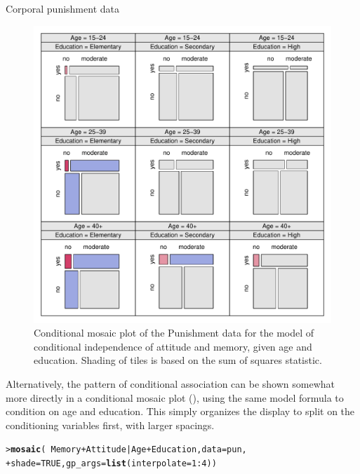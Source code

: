 \documentclass[10pt,krantz2]{krantz}\usepackage[]{graphicx}\usepackage[]{color}
\makeatletter
\newcommand{\hlnum}[1]{\textcolor[rgb]{0.686,0.059,0.569}{#1}}%
\newcommand{\hlopt}[1]{\textcolor[rgb]{0,0,0}{#1}}%
\newcommand{\hlstd}[1]{\textcolor[rgb]{0.345,0.345,0.345}{#1}}%
\newcommand{\hlkwc}[1]{\textcolor[rgb]{0.333,0.667,0.333}{#1}}%
\newcommand{\hlkwd}[1]{\textcolor[rgb]{0.737,0.353,0.396}{\textbf{#1}}}%
\newenvironment{kframe}{%
 \def\at@end@of@kframe{}%
 \ifinner\ifhmode%
  \def\at@end@of@kframe{\end{minipage}}%
  \begin{minipage}{\columnwidth}%
 \fi\fi%
 \def\FrameCommand##1{\hskip\@totalleftmargin \hskip-\fboxsep
 \colorbox{shadecolor}{##1}\hskip-\fboxsep
     \hskip-\linewidth \hskip-\@totalleftmargin \hskip\columnwidth}%
 \MakeFramed {\advance\hsize-\width
   \@totalleftmargin\z@ \linewidth\hsize
   \@setminipage}}%
 {\par\unskip\endMakeFramed%
 \at@end@of@kframe}
\newenvironment{knitrout}{}{} %
\renewenvironment{knitrout}{\small\renewcommand{\baselinestretch}{.85}}{} %
\makeatother
\begin{document}
\begin{Example}[punish]{Corporal punishment data}
\begin{knitrout}
\begin{figure}[!htb]
\centerline{\includegraphics[width=.95\textwidth]{ch05/fig/punish-cond1-1} }

\caption[Conditional mosaic plot of the Punishment data for the model of conditional independence of attitude and memory, given age and education]{Conditional mosaic plot of the Punishment data for the model of conditional independence of attitude and memory, given age and education. Shading of tiles is based on the sum of squares statistic.\label{fig:punish-cond1}}
\end{figure}


\end{knitrout}

Alternatively, the pattern of conditional association can be shown somewhat more directly
in a conditional mosaic plot (), using the same model formula to condition on
age and education. This simply organizes the display to split on the conditioning
variables first, with larger spacings.
\begin{knitrout}
\color{fgcolor}\begin{kframe}
\begin{alltt}
\hlstd{> }\hlkwd{mosaic}\hlstd{(}\hlopt{~} \hlstd{Memory} \hlopt{+} \hlstd{Attitude} \hlopt{|} \hlstd{Age} \hlopt{+} \hlstd{Education,} \hlkwc{data} \hlstd{= pun,}
\hlstd{+ }       \hlkwc{shade} \hlstd{=} \hlnum{TRUE}\hlstd{,} \hlkwc{gp_args} \hlstd{=} \hlkwd{list}\hlstd{(}\hlkwc{interpolate} \hlstd{=} \hlnum{1} \hlopt{:} \hlnum{4}\hlstd{))}
\end{alltt}
\end{kframe}\begin{figure}[!htb]


\end{figure}
\end{knitrout}
\end{Example}
\end{document}
